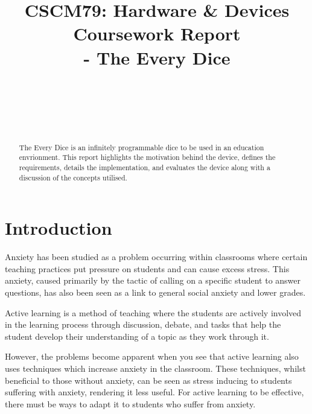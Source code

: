 \documentclass{sigchi}
\begin{document}
\title{CSCM79: Hardware \& Devices Coursework Report \\- The Every Dice}

\author{%
  \\
  \\
  \\
  \\
}

\maketitle

\begin{abstract}

The Every Dice is an infinitely programmable dice to be used in an education envrionment. This report highlights the motivation behind the device, defines the requirements, details the implementation, and evaluates the device along with a discussion of the concepts utilised.

\end{abstract}

\section{Introduction}

Anxiety has been studied as a problem occurring within classrooms where certain teaching practices put pressure on students and can cause excess stress. This anxiety, caused primarily by the tactic of calling on a specific student to answer questions, has also been seen as a link to general social anxiety and lower grades.  

Active learning is a method of teaching where the students are actively involved in the learning process through discussion, debate, and tasks that help the student develop their understanding of a topic as they work through it. 

However, the problems become apparent when you see that active learning also uses techniques which increase anxiety in the classroom. These techniques, whilst beneficial to those without anxiety, can be seen as stress inducing to students suffering with anxiety, rendering it less useful. For active learning to be effective, there must be ways to adapt it to students who suffer from anxiety. 
\end{document}
